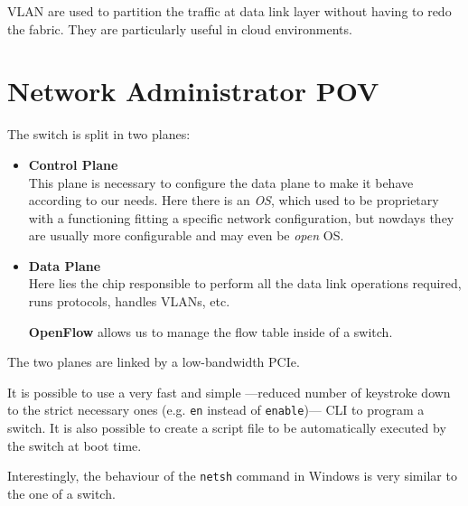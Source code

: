 VLAN are used to partition the traffic at data link layer without having to redo the fabric. They are particularly useful in cloud environments.

\section{Network Administrator POV}
The switch is split in two planes:
\begin{itemize}
   \item \textbf{Control Plane}\\
   This plane is necessary to configure the data plane to make it behave according to our needs.
   Here there is an \textit{OS}, which used to be proprietary with a functioning fitting a specific network configuration, but nowdays they are usually more configurable and may even be \textit{open} OS.
   
   \item \textbf{Data Plane}\\
   Here lies the chip responsible to perform all the data link operations required, runs protocols, handles VLANs, etc.

   \textbf{OpenFlow} allows us to manage the flow table inside of a switch.
\end{itemize}

The two planes are linked by a low-bandwidth PCIe.


It is possible to use a very fast and simple ---reduced number of keystroke down to the strict necessary ones (e.g. \texttt{en} instead of \texttt{enable})--- CLI to program a switch. It is also possible to create a script file to be automatically executed by the switch at boot time.

Interestingly, the behaviour of the \texttt{netsh} command in Windows is very similar to the one of a switch.
